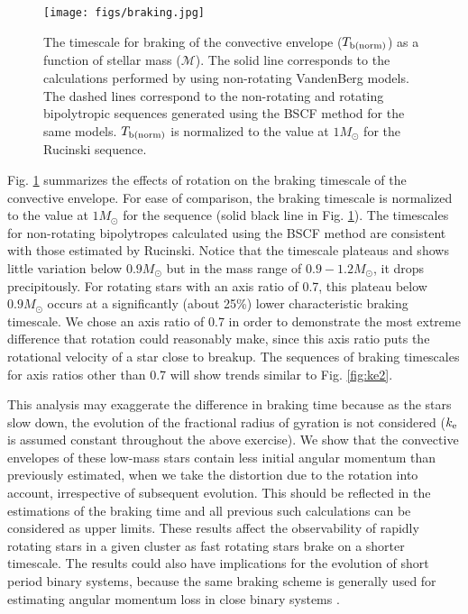 \documentclass[a4paper,fleqn,usenatbib]{mnras}
\begin{document}
 \begin{figure} 
\centering
\texttt{[image: figs/braking.jpg]}
\caption{The timescale for braking of the convective envelope ($T_{\rm b (norm)}$) as a function of stellar mass ($\mathcal{M}$). The solid line corresponds to the calculations 
performed by \protect \cite{Rucinski1988} using non-rotating VandenBerg models. The dashed lines correspond to the non-rotating and 
rotating bipolytropic sequences generated using the BSCF method for the same models. $T_{\rm b(norm)}$ is normalized to the value at $1 M_{\odot}$ for the Rucinski sequence.}%
\label{fig:braking}
\end{figure} 


Fig. \ref{fig:braking} summarizes the effects of rotation on the braking timescale of the convective envelope. For ease of comparison, the braking timescale is normalized to the value at $1 M_{\odot}$ for the \cite{Rucinski1988} sequence (solid black line in Fig. \ref{fig:braking}).
The timescales for non-rotating bipolytropes calculated using the BSCF method are consistent with those estimated by Rucinski. 
Notice that the timescale plateaus and shows little variation below $0.9 M_{\odot}$ but in the mass range of $0.9 - 1.2 M_{\odot}$, it drops precipitously.   
For rotating stars with an axis ratio of 0.7, this plateau below $0.9 M_{\odot}$ occurs at a significantly (about 25\%) lower characteristic braking timescale. 
We chose an axis ratio of 0.7 in order to demonstrate the most extreme difference that rotation could reasonably make,
since this axis ratio puts the rotational velocity of a star close to breakup.
The sequences of braking timescales for axis ratios other than 0.7 will show trends similar to Fig. \ref{fig:ke2}.

This analysis may exaggerate the difference in braking time because as the stars slow down, the evolution of the fractional radius of gyration is not considered ($k_{\rm e}$ is assumed constant throughout the above exercise). We show that the convective envelopes of these low-mass stars contain less initial angular momentum than previously estimated, when we take the distortion due to the rotation into account, irrespective of subsequent evolution. 
This should be reflected in the estimations of the braking time and all previous such calculations can be considered as upper limits. 
These results affect the observability of rapidly rotating stars in a given cluster as fast rotating stars brake on a shorter timescale.
The results could also have implications for the evolution of short period binary systems, because the same braking scheme is generally used for estimating angular momentum loss in close binary systems \citep{Vilhu1982}.
\end{document}
